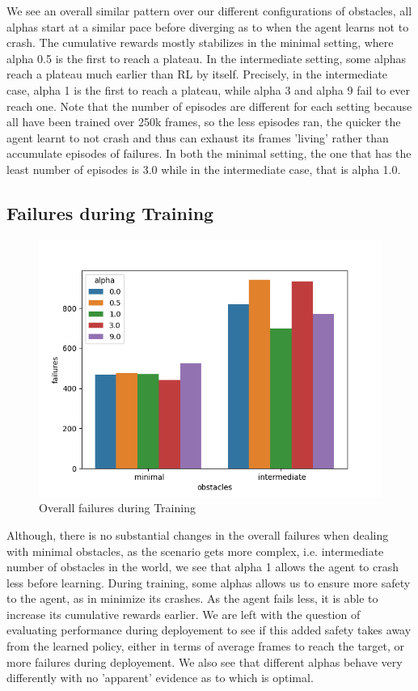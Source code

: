     \smallskip
  We see an overall similar pattern over our different configurations of obstacles, 
  all alphas start at a similar pace before diverging as to when the agent learns not to crash. 
  The cumulative rewards mostly stabilizes in the minimal setting, where alpha 0.5 is the first to reach a plateau. 
  In the intermediate setting, some alphas reach a plateau much earlier than RL by itself. 
  Precisely, in the intermediate case, alpha 1 is the first to reach a plateau, while alpha 3 and alpha 9 fail to ever reach one. 
  Note that the number of episodes are different for each setting because all have been trained over 250k frames, so the less episodes ran, 
  the quicker the agent learnt to not crash and thus can exhaust its frames 'living' rather than accumulate episodes of failures. 
  In both the minimal setting, the one that has the least number of episodes is 3.0 while in the intermediate case, that is alpha 1.0.

\subsection{Failures during Training}
\begin{figure}[H]
    \centering
    \includegraphics[scale=0.8]{figures/sfe.png}
    \caption{Overall failures during Training}
    \label{fig:sfe}
  \end{figure}

  Although, there is no substantial changes in the overall failures when dealing with minimal obstacles, as the scenario gets more complex, i.e. intermediate number of obstacles in the world, 
  we see that alpha 1 allows the agent to crash less before learning. 
  During training, some alphas allows us to ensure more safety to the agent, as in minimize its crashes. As the agent fails less, it is able to increase its cumulative rewards earlier. 
  We are left with the question of evaluating performance during deployement to see if this added safety takes away from the learned policy, either in terms of average frames to reach the target, or 
  more failures during deployement. We also see that different alphas behave very differently with no 'apparent' evidence as to which is optimal. 

